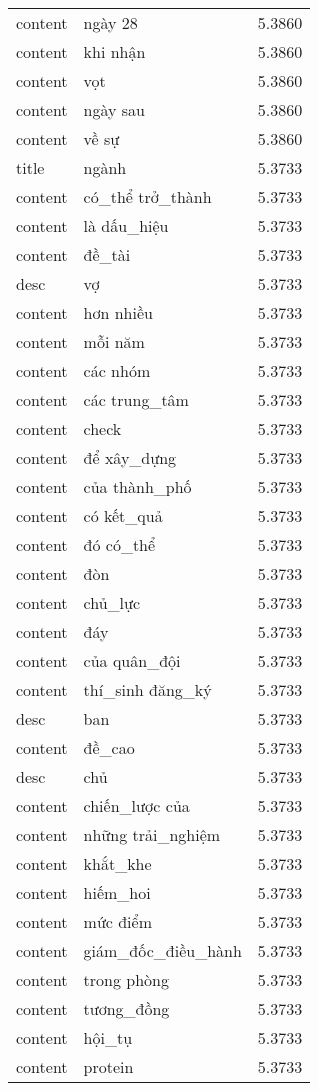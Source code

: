 \documentclass{article}
\begin{document}
\begin{tabular}{lll}
content & ngày 28 & 5.3860\\
content & khi nhận & 5.3860\\
content & vọt & 5.3860\\
content & ngày sau & 5.3860\\
content & về sự & 5.3860\\
title & ngành & 5.3733\\
content & có\_thể trở\_thành & 5.3733\\
content & là dấu\_hiệu & 5.3733\\
content & đề\_tài & 5.3733\\
desc & vợ & 5.3733\\
content & hơn nhiều & 5.3733\\
content & mỗi năm & 5.3733\\
content & các nhóm & 5.3733\\
content & các trung\_tâm & 5.3733\\
content & check & 5.3733\\
content & để xây\_dựng & 5.3733\\
content & của thành\_phố & 5.3733\\
content & có kết\_quả & 5.3733\\
content & đó có\_thể & 5.3733\\
content & đòn & 5.3733\\
content & chủ\_lực & 5.3733\\
content & đáy & 5.3733\\
content & của quân\_đội & 5.3733\\
content & thí\_sinh đăng\_ký & 5.3733\\
desc & ban & 5.3733\\
content & đề\_cao & 5.3733\\
desc & chủ & 5.3733\\
content & chiến\_lược của & 5.3733\\
content & những trải\_nghiệm & 5.3733\\
content & khắt\_khe & 5.3733\\
content & hiếm\_hoi & 5.3733\\
content & mức điểm & 5.3733\\
content & giám\_đốc\_điều\_hành & 5.3733\\
content & trong phòng & 5.3733\\
content & tương\_đồng & 5.3733\\
content & hội\_tụ & 5.3733\\
content & protein & 5.3733\\

\end{tabular}
\end{document}

